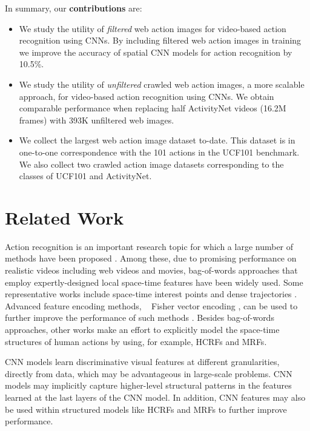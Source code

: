 \documentclass[10pt,twocolumn,letterpaper]{article}
\begin{document}
In summary, our \textbf{contributions} are:
\begin{itemize}
\item We study the utility of {\em filtered} web action images for video-based action recognition using CNNs. By including filtered web action images in training we improve the accuracy of spatial CNN models for action recognition by 10.5\%. 
\item We study the utility of {\em unfiltered} crawled web action images, a more scalable approach, for video-based action recognition using CNNs. We obtain comparable performance when replacing half ActivityNet videos (16.2M frames) with 393K unfiltered web images.
\item We collect the largest web action image dataset to-date. This dataset is in one-to-one correspondence with the 101 actions in the UCF101 benchmark. We also collect two crawled action image datasets corresponding to the classes of UCF101 and ActivityNet. 
\end{itemize}

\section{Related Work}
Action recognition is an important research topic for which a large number of methods have been proposed \cite{weinland2011survey}. Among these, due to promising performance on realistic videos including web videos and movies, bag-of-words approaches that employ expertly-designed local space-time features have been widely used. Some representative works include space-time interest points \cite{laptev08} and dense trajectories \cite{wang2013improve}. Advanced feature encoding methods, \eg~ Fisher vector encoding \cite{perronnin2010improving}, can be used to further improve the performance of such methods \cite{wang2013lear}. Besides bag-of-words approaches, other works make an effort to explicitly model the space-time structures of human actions \cite{Raptis2013, WangQT14, WangM11} by using, for example, HCRFs and MRFs. 

CNN models learn discriminative visual features at different granularities, directly from data, which may be advantageous in large-scale problems. CNN models may implicitly capture higher-level structural patterns in the features learned at the last layers of the CNN model. In addition, CNN features may also be used within structured models like HCRFs and MRFs to further improve performance. 
\end{document}
